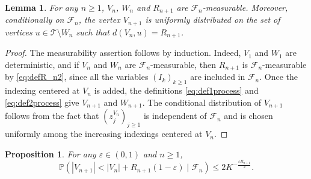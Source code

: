 \documentclass[french]{article}
\newcommand{\zi}{z}
\newtheorem{prop}[theorem]{Proposition}
\newtheorem{lemma}[theorem]{Lemma}
\renewcommand{\P}{\mathbb{P}}
\newcommand{\T}{\mathcal{T}}
\renewcommand{\1}{\mathds{1}}
\begin{document}
\begin{lemma} 
For any $n\ge 1$, $V_n$, $W_n$ and $R_{n+1}$ are $\mathcal{F}_n$-measurable.  
Moreover, conditionally on $\mathcal{F}_n$, the vertex $V_{n+1}$ is uniformly distributed on the set of vertices $u\in \T\setminus W_n$ such that $d(V_n,u)=R_{n+1}$. 
\end{lemma}

\begin{proof}
The measurability assertion follows by induction. Indeed, $V_1$ and $W_1$ are deterministic, and if $V_n$ and $W_n$ are $\mathcal F_n$-measurable, then $R_{n+1}$ is $\mathcal F_n$-measurable by \eqref{eq:defR_n2}, since all the variables $(I_k)_{k\ge1}$ are included in $\mathcal F_n$. Once the indexing centered at $V_n$ is added, the definitions \eqref{eq:def1process} and \eqref{eq:def2process} give $V_{n+1}$ and $W_{n+1}$. The conditional distribution of $V_{n+1}$ follows from the fact that $(\zi_j^{V_n})_{j\ge 1}$ is independent of $\mathcal{F}_n$ and is chosen uniformly among the increasing indexings centered at $V_n$.
\end{proof}



\begin{prop}\label{prop:V_nconditionnelle}
    For any $\varepsilon\in (0,1)$ and $n\ge 1$,
    $$\P(|V_{n+1}|< |V_{n}|+R_{n+1}(1-\varepsilon) \mid \mathcal{F}_{n})\le 2K^{-\frac{\varepsilon R_{n+1}}{2}}.$$
\end{prop}
\end{document}
